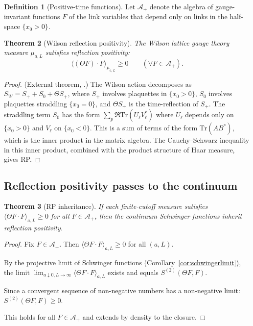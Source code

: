 \documentclass[12pt]{article}
\theoremstyle{plain}
\newtheorem{theorem}{Theorem}[section]
\theoremstyle{definition}
\newtheorem{definition}[theorem]{Definition}
\numberwithin{equation}{section}
\begin{document}
\begin{definition}[Positive-time functions]
Let $\mathcal{A}_+$ denote the algebra of gauge-invariant functions $F$ of the link variables that depend only on links in the half-space $\{x_0>0\}$.
\end{definition}

\begin{theorem}[Wilson reflection positivity]\label{thm:WilsonRP}
The Wilson lattice gauge theory measure $\mu_{a,L}$ satisfies reflection positivity:
\begin{equation}
\langle(\Theta F)\cdot F\rangle_{\mu_{a,L}} \geq 0\qquad(\forall F\in\mathcal{A}_+).
\end{equation}
\end{theorem}

\begin{proof}
(External theorem, \cite{WilsonRP}.)
The Wilson action decomposes as $S_W=S_++S_0+\Theta S_+$, where $S_+$ involves plaquettes in $\{x_0>0\}$, $S_0$ involves plaquettes straddling $\{x_0=0\}$, and $\Theta S_+$ is the time-reflection of $S_+$.  The straddling term $S_0$ has the form $\sum_p\Re\mathrm{Tr}(U_\ell V_\ell^*)$ where $U_\ell$ depends only on $\{x_0>0\}$ and $V_\ell$ on $\{x_0<0\}$.  This is a sum of terms of the form $\mathrm{Tr}(AB^*)$, which is the inner product in the matrix algebra.  The Cauchy--Schwarz inequality in this inner product, combined with the product structure of Haar measure, gives RP.
\end{proof}

\subsection{Reflection positivity passes to the continuum}

\begin{theorem}[RP inheritance]\label{thm:RPlimit}
If each finite-cutoff measure satisfies $\langle\Theta F\cdot F\rangle_{a,L}\geq 0$ for all $F\in\mathcal{A}_+$, then the continuum Schwinger functions inherit reflection positivity.
\end{theorem}

\begin{proof}
Fix $F\in\mathcal{A}_+$.  Then $\langle\Theta F\cdot F\rangle_{a,L}\geq 0$ for all $(a,L)$.

By the projective limit of Schwinger functions (Corollary~\ref{cor:schwingerlimit}), the limit $\lim_{a\downarrow 0,L\to\infty}\langle\Theta F\cdot F\rangle_{a,L}$ exists and equals $S^{(2)}(\Theta F,F)$.

Since a convergent sequence of non-negative numbers has a non-negative limit: $S^{(2)}(\Theta F,F)\geq 0$.

This holds for all $F\in\mathcal{A}_+$ and extends by density to the closure.
\end{proof}
\end{document}
